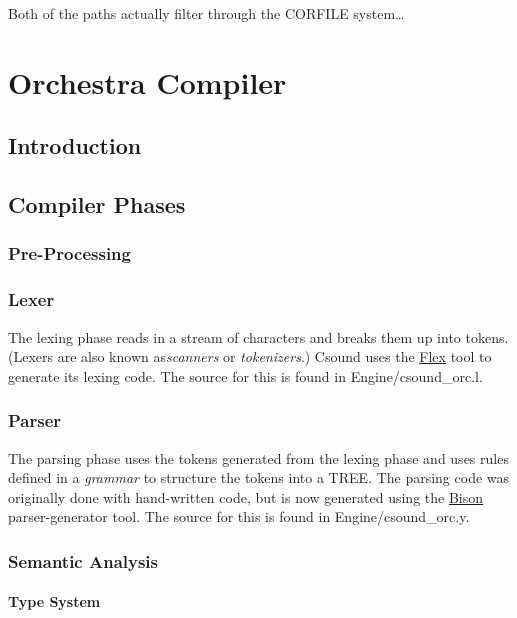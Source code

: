 \documentclass[]{book}
\begin{document}
Both of the paths actually filter through the CORFILE system\ldots{}

\chapter{Orchestra Compiler}

\section{Introduction}

\section{Compiler Phases}

\subsection{Pre-Processing}

\subsection{Lexer}

The lexing phase reads in a stream of characters and breaks them up into
tokens. (Lexers are also known as\emph{scanners} or \emph{tokenizers}.)
Csound uses the \href{http://flex.sourceforge.net/}{Flex} tool to
generate its lexing code. The source for this is found in
Engine/csound\_orc.l.

\subsection{Parser}

The parsing phase uses the tokens generated from the lexing phase and
uses rules defined in a \emph{grammar} to structure the tokens into a
TREE. The parsing code was originally done with hand-written code, but
is now generated using the
\href{http://www.gnu.org/software/bison/}{Bison} parser-generator tool.
The source for this is found in Engine/csound\_orc.y.

\subsection{Semantic Analysis}

\subsubsection{Type System}
\end{document}
